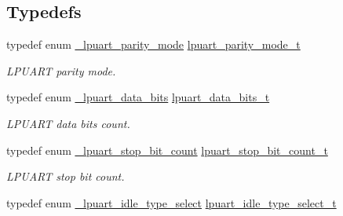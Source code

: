 \subsection*{Typedefs}
\begin{DoxyCompactItemize}
\item 
\mbox{\label{group__lpuart__driver_gab5b7fa64ce57a2f68327e745f4a3e0b2}} 
typedef enum \mbox{\hyperlink{group__lpuart__driver_ga22a746cfd0fffff30eaf27f8795b2059}{\+\_\+lpuart\+\_\+parity\+\_\+mode}} \mbox{\hyperlink{group__lpuart__driver_gab5b7fa64ce57a2f68327e745f4a3e0b2}{lpuart\+\_\+parity\+\_\+mode\+\_\+t}}
\begin{DoxyCompactList}\small\item\em L\+P\+U\+A\+RT parity mode. \end{DoxyCompactList}\item 
\mbox{\label{group__lpuart__driver_gad36b5360ffc95732471dab9bd8f74c3b}} 
typedef enum \mbox{\hyperlink{group__lpuart__driver_ga565561e02414c90014f13391a1dd7dd5}{\+\_\+lpuart\+\_\+data\+\_\+bits}} \mbox{\hyperlink{group__lpuart__driver_gad36b5360ffc95732471dab9bd8f74c3b}{lpuart\+\_\+data\+\_\+bits\+\_\+t}}
\begin{DoxyCompactList}\small\item\em L\+P\+U\+A\+RT data bits count. \end{DoxyCompactList}\item 
\mbox{\label{group__lpuart__driver_ga5c25153c13c99b8c63d8e78cdfeea30f}} 
typedef enum \mbox{\hyperlink{group__lpuart__driver_gad19fe7bcda436707337f6d529d5da155}{\+\_\+lpuart\+\_\+stop\+\_\+bit\+\_\+count}} \mbox{\hyperlink{group__lpuart__driver_ga5c25153c13c99b8c63d8e78cdfeea30f}{lpuart\+\_\+stop\+\_\+bit\+\_\+count\+\_\+t}}
\begin{DoxyCompactList}\small\item\em L\+P\+U\+A\+RT stop bit count. \end{DoxyCompactList}\item 
\mbox{\label{group__lpuart__driver_gad2f95b94d8a055a75e2099e11df4aece}} 
typedef enum \mbox{\hyperlink{group__lpuart__driver_ga5f767cb7f8458682f742f2e7d4bda63d}{\+\_\+lpuart\+\_\+idle\+\_\+type\+\_\+select}} \mbox{\hyperlink{group__lpuart__driver_gad2f95b94d8a055a75e2099e11df4aece}{lpuart\+\_\+idle\+\_\+type\+\_\+select\+\_\+t}}

\end{DoxyCompactItemize}
